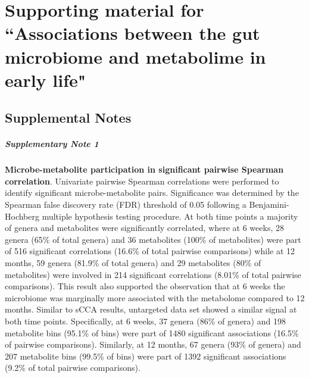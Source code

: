 \chapter{Supporting material for ``Associations between the gut microbiome and metabolime in early life"}

\section{Supplemental Notes} 
\paragraph{Supplementary Note 1}
\label{appB_note1}
{\bf Microbe-metabolite participation in significant pairwise Spearman correlation}. Univariate pairwise Spearman correlations were performed to identify significant microbe-metabolite pairs. Significance was determined by the Spearman false discovery rate (FDR) threshold of 0.05 following a Benjamini-Hochberg multiple hypothesis testing procedure.  At both time points a majority of genera and metabolites were significantly correlated, where at 6 weeks, 28 genera (65\% of total genera) and 36 metabolites (100\% of metabolites) were part of 516 significant correlations (16.6\% of total pairwise comparisons) while at 12 months, 59 genera (81.9\% of total genera) and 29 metabolites (80\% of metabolites) were involved in 214 significant correlations (8.01\% of total pairwise comparisons). This result also supported the observation that at 6 weeks the microbiome was marginally more associated with the metabolome compared to 12 months. Similar to sCCA results, untargeted data set showed a similar signal at both time points. Specifically, at 6 weeks, 37 genera (86\% of genera) and 198 metabolite bins (95.1\% of bins) were part of 1480 significant associations (16.5\% of pairwise comparisons). Similarly, at 12 months, 67 genera (93\% of genera) and 207 metabolite bins (99.5\% of bins) were part of 1392 significant associations (9.2\% of total pairwise comparisons). 

